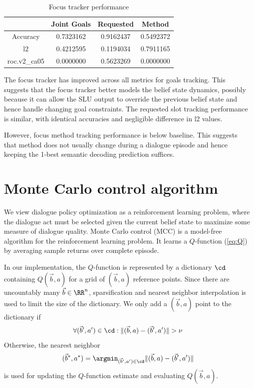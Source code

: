 \documentclass[a4paper,oneside,reqno]{amsart}
\begin{document}
\begin{table}[ht!]
  \begin{tabular}{cccc}
    \toprule
                  &   Joint Goals   &    Requested    &      Method    \\
    \midrule
    Accuracy      &    0.7323162    &    0.9162437    &    0.5492372   \\
    l2            &    0.4212595    &    0.1194034    &    0.7911165   \\
    roc.v2\_ca05  &    0.0000000    &    0.5623269    &    0.0000000   \\
    \bottomrule
  \end{tabular}
  \caption{Focus tracker performance}
  \label{tab:focus-tracker}
\end{table}

The focus tracker has improved across all metrics for goals tracking. This
suggests that the focus tracker better models the belief state dynamics,
possibly because it can allow the SLU output to override the previous belief
state and hence handle changing goal constraints. The requested slot tracking
performance is similar, with identical accuracies and negligible difference in
l2 values.

However, focus method tracking performance is below baseline. This suggests that
method does not usually change during a dialogue episode and hence keeping the
1-best semantic decoding prediction suffices.

\section{Monte Carlo control algorithm}

We view dialogue policy optimization as a reinforcement learning problem, where
the dialogue act must be selected given the current belief state to maximize
some measure of dialogue quality.  Monte Carlo control (MCC) is a model-free
algorithm for the reinforcement learning problem. It learns a $Q$-function
(\autoref{eq:Q}) by averaging sample returns over complete episode.

In our implementation, the $Q$-function is represented by a dictionary $\cd$
containing $Q(\vec{b},a)$ for a grid of $(\vec{b},a)$ reference points. Since there are
uncountably many $\vec{b} \in \RR^n$, sparsification and nearest neighbor
interpolation is used to limit the size of the dictionary. We only add a
$(\vec{b},a)$ point to the dictionary if
\[
  \forall (\vec{b}',a') \in \cd: \|(\vec{b},a) - (\vec{b}',a')\| > \nu
\]
Otherwise, the nearest neighbor
\[
  (\vec{b}^*,a^*) = \argmin_{(\vec{b}',a') \in \cd} \|(\vec{b},a) - (\vec{b}',a')\|
\]
is used for updating the $Q$-function estimate and evaluating $Q(\vec{b},a)$.
\end{document}
